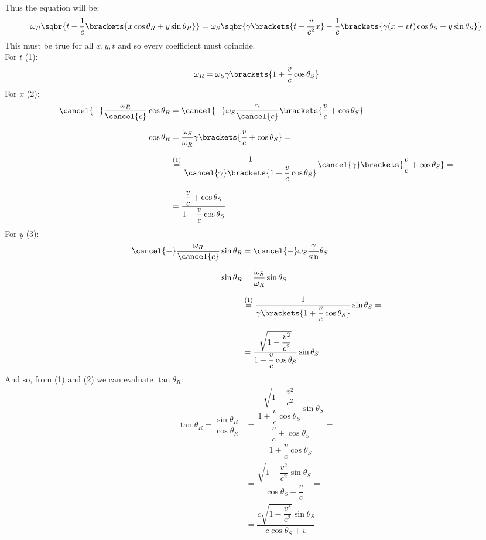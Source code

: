 Thus the equation will be:
\begin{equation}
  \omega_{R}\sqbr{t-\dfrac{1}{c}\brackets{x\cos\theta_R + y\sin\theta_R}} = \omega_{S}\sqbr{\gamma\brackets{t - \dfrac{v}{c^2}x} - \dfrac{1}{c}\brackets{\gamma(x - vt)\cos\theta_S + y\sin\theta_S}}
\end{equation}
This must be true for all $x,y,t$ and so every coefficient must coincide.\\
For $t$ (1):
\begin{equation}
  \omega_R  = \omega_S \gamma\brackets{1 + \dfrac{v}{c}\cos \theta_S}
\end{equation}
For $x$ (2):
\begin{equation}
  \begin{split}
    \cancel{-}\dfrac{\omega_R}{\cancel{c}}\cos \theta_R &= \cancel{-}\omega_S \dfrac{\gamma}{\cancel{c}}\brackets{\dfrac{v}{c} + \cos \theta_S}\\[8pt]
    \cos \theta_R  &= \dfrac{\omega_S}{\omega_R} \gamma \brackets{\dfrac{v}{c} + \cos \theta_S} =\\[8pt]
    &\overset{(1)}{=} \dfrac{1}{\cancel{\gamma}\brackets{1 + \dfrac{v}{c}\cos \theta_S}} \cancel{\gamma} \brackets{\dfrac{v}{c} + \cos \theta_S} =\\[8pt]
    &= \dfrac{\dfrac{v}{c} + \cos \theta_S}{1 + \dfrac{v}{c}\cos \theta_S}
  \end{split}
\end{equation}
For $y$ (3):
\begin{equation}
  \begin{split}
    \cancel{-}\dfrac{\omega_R}{\cancel{c}}\sin \theta_R &= \cancel{-}\omega_S \dfrac{\gamma}\sin \theta_S\\[8pt]
    \sin \theta_R &= \dfrac{\omega_S}{\omega_R}\sin \theta_S = \\[8pt]
    &\overset{(1)}{=} \dfrac{1}{\gamma\brackets{1 + \dfrac{v}{c}\cos \theta_S}}\sin \theta_S = \\[8pt]
    &= \dfrac{\sqrt{1-\dfrac{v^2}{c^2}}}{1 + \dfrac{v}{c}\cos \theta_S}\sin \theta_S
  \end{split}
\end{equation}
And so, from (1) and (2) we can evaluate $\tan \theta_R$:
\begin{equation}
  \begin{split}
    \tan \theta_R = \dfrac{\sin \theta_R}{\cos \theta_R} &= \dfrac{\dfrac{\sqrt{1-\dfrac{v^2}{c^2}}}{1 + \dfrac{v}{c}\cos \theta_S}\sin \theta_S}{\dfrac{\dfrac{v}{c} + \cos \theta_S}{1 + \dfrac{v}{c}\cos \theta_S}} = \\[8pt]
    &= \dfrac{\sqrt{1-\dfrac{v^2}{c^2}}\sin \theta_S}{\cos \theta_S + \dfrac{v}{c}} = \\[8pt]
    &= \dfrac{c\sqrt{1-\dfrac{v^2}{c^2}}\sin \theta_S}{c\cos \theta_S + v}
  \end{split}
\end{equation}

